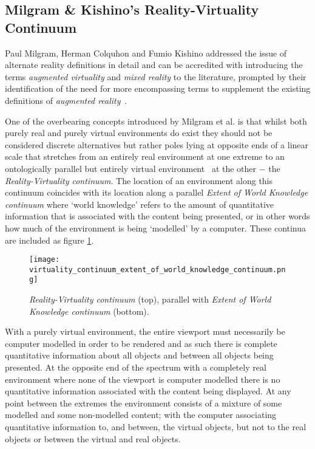 \subsection{Milgram \& Kishino's Reality-Virtuality Continuum}
\label{milgram&kishino}
Paul Milgram, Herman Colquhon and Fumio Kishino addressed the issue of alternate reality definitions in detail and can be accredited with introducing the terms \textit{augmented virtuality} and \textit{mixed reality} to the literature, prompted by their identification of the need for more encompassing terms to supplement the existing definitions of \textit{augmented reality}~\cite{Milgram1994, Milgram1999}.


One of the overbearing concepts introduced by Milgram et al. is that whilst both purely real and purely virtual environments do exist they should not be considered discrete alternatives but rather poles lying at opposite ends of a linear scale that stretches from an entirely real environment at one extreme to an ontologically parallel but entirely virtual environment~\cite{Qvortrup2002} at the other $-$ the \textit{Reality-Virtuality continuum}. The location of an environment along this continuum coincides with its location along a parallel \textit{Extent of World Knowledge continuum} where `world knowledge' refers to the amount of quantitative information that is associated with the content being presented, or in other words how much of the environment is being `modelled' by a computer. These continua are included as figure \ref{reality_virtuality_extent_of_world_knowledge_continuum}.

\begin{figure}[h]
\centering
\texttt{[image: virtuality\_continuum\_extent\_of\_world\_knowledge\_continuum.png]}
\caption{\textit{Reality-Virtuality continuum} (top), parallel with \textit{Extent of World Knowledge continuum} (bottom).}
\label{reality_virtuality_extent_of_world_knowledge_continuum}
\end{figure}

With a purely virtual environment, the entire viewport must necessarily be computer modelled in order to be rendered and as such there is complete quantitative information about all objects and between all objects being presented. At the opposite end of the spectrum with a completely real environment where none of the viewport is computer modelled there is no quantitative information associated with the content being displayed. At any point between the extremes the environment consists of a mixture of some modelled and some non-modelled content; with the computer associating quantitative information to, and between, the virtual objects, but not to the real objects or between the virtual and real objects.

